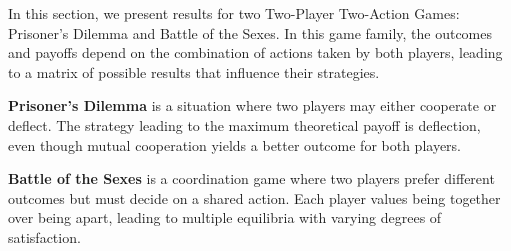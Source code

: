 \documentclass{article}
\begin{document}
In this section, we present results for two Two-Player Two-Action Games: Prisoner's Dilemma and Battle of the Sexes. In this game family, the outcomes and payoffs depend on the combination of actions taken by both players, leading to a matrix of possible results that influence their strategies.

\textbf{Prisoner's Dilemma} is a situation where two players may either cooperate or deflect. The strategy leading to the maximum theoretical payoff is deflection, even though mutual cooperation yields a better outcome for both players.

\textbf{Battle of the Sexes} is a coordination game where two players prefer different outcomes but must decide on a shared action. Each player values being together over being apart, leading to multiple equilibria with varying degrees of satisfaction.







\end{document}
